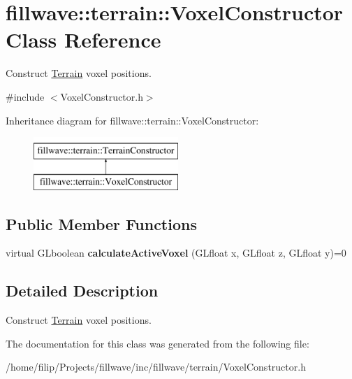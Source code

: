 \hypertarget{classfillwave_1_1terrain_1_1VoxelConstructor}{}\section{fillwave\+:\+:terrain\+:\+:Voxel\+Constructor Class Reference}
\label{classfillwave_1_1terrain_1_1VoxelConstructor}


Construct \hyperlink{classfillwave_1_1terrain_1_1Terrain}{Terrain} voxel positions.  




{\ttfamily \#include $<$Voxel\+Constructor.\+h$>$}

Inheritance diagram for fillwave\+:\+:terrain\+:\+:Voxel\+Constructor\+:\begin{figure}[H]
\begin{center}
\leavevmode
\includegraphics[height=2.000000cm]{classfillwave_1_1terrain_1_1VoxelConstructor}
\end{center}
\end{figure}
\subsection*{Public Member Functions}
\begin{DoxyCompactItemize}
\item 
\hypertarget{classfillwave_1_1terrain_1_1VoxelConstructor_aa29a02faf7f85db583b361b112ac8f0a}{}virtual G\+Lboolean {\bfseries calculate\+Active\+Voxel} (G\+Lfloat x, G\+Lfloat z, G\+Lfloat y)=0\label{classfillwave_1_1terrain_1_1VoxelConstructor_aa29a02faf7f85db583b361b112ac8f0a}

\end{DoxyCompactItemize}


\subsection{Detailed Description}
Construct \hyperlink{classfillwave_1_1terrain_1_1Terrain}{Terrain} voxel positions. 

The documentation for this class was generated from the following file\+:\begin{DoxyCompactItemize}
\item 
/home/filip/\+Projects/fillwave/inc/fillwave/terrain/Voxel\+Constructor.\+h\end{DoxyCompactItemize}
